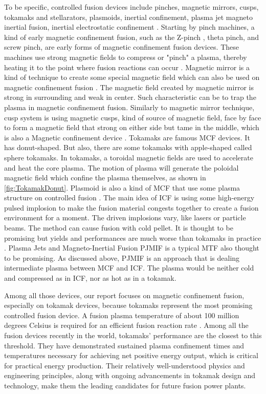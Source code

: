 To be specific, controlled fusion devices include pinches, magnetic mirrors, cusps, tokamaks and stellarators, plasmoids, inertial confinement, plasma jet magneto inertial fusion, inertial electrostatic confinement \cite{moynihan2023fusion}. Starting by pinch machines, a kind of early magnetic confinement fusion, such as the Z-pinch \cite{shumlak2020z}, theta pinch, and screw pinch, are early forms of magnetic confinement fusion devices. These machines use strong magnetic fields to compress or "pinch" a plasma, thereby heating it to the point where fusion reactions can occur \cite{ moynihan2023fusion}. Magnetic mirror is a kind of technique to create some special magnetic field which can also be used on magnetic confinement fusion \cite{post1987magnetic}. The magnetic field created by magnetic mirror is strong in surrounding and weak in center. Such characteristic can be to trap the plasma in magnetic confinement fusion.  Similarly to magnetic mirror technique, cusp system is using magnetic cusps, kind of source of magnetic field, face by face to form a magnetic field that strong on either side but tame in the middle, which is also a Magnetic confinement device \cite{mahadevia2014bicuspid, moynihan2023fusion, haines1977plasma}. Tokamaks are famous MCF devices. It has donut-shaped. But also, there are some tokamaks with apple-shaped called sphere tokamaks. In tokamaks, a toroidal magnetic fields are used to accelerate and heat the core plasma. The motion of plasma will generate the poloidal magnetic field which confine the plasma themselves, as shown in \ref{fig:TokamakDonut}. Plasmoid is also a kind of MCF that use some plasma structure on controlled fusion \cite{moynihan2023fusion}. The main idea of ICF is using some high-energy pulsed implosion to make the fusion material congests together to create a fusion environment for a moment. The driven implosions vary, like lasers or particle beams. The method can cause fusion with cold pellet. It is thought to be promising but yields and performances are much worse than tokamaks in practice \cite{cerniauskaite2011systematic}. Plasma Jets and Magneto-Inertial Fusion PJMIF is a typical MTF also thought to be promising. As discussed above, PJMIF is an approach that is dealing intermediate plasma between MCF and ICF. The plasma would be neither cold and compressed as in ICF, nor as hot as in a tokamak. 

Among all those devices, our report focuses on magnetic confinement fusion, especially on tokamak devices, because tokamaks represent the most promising controlled fusion device. A fusion plasma temperature of about 100 million degrees Celsius is required for an efficient fusion reaction rate \cite{li2021experimental}. Among all the fusion devices recently in the world, tokamaks' performance are the closest to this threshold. They have demonstrated sustained plasma confinement times and temperatures necessary for achieving net positive energy output, which is critical for practical energy production. Their relatively well-understood physics and engineering principles, along with ongoing advancements in tokamak design and technology, make them the leading candidates for future fusion power plants.
